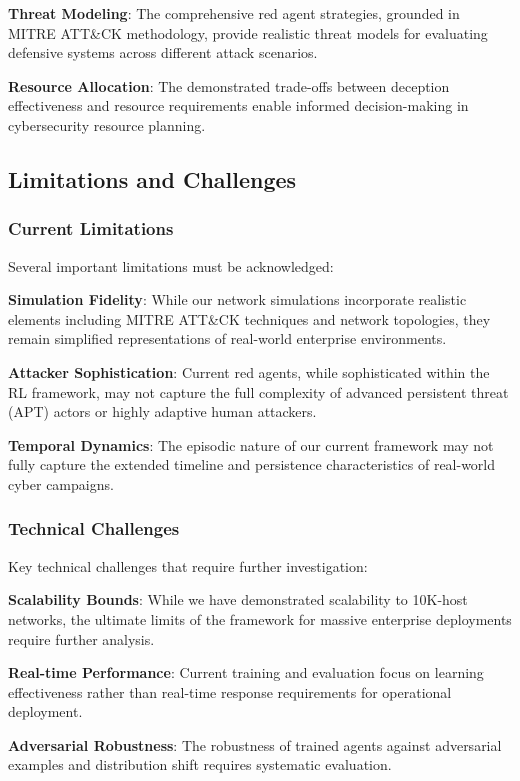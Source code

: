 \documentclass[11pt]{article}
\theoremstyle{definition}
\theoremstyle{plain}
\begin{document}
\textbf{Threat Modeling}: The comprehensive red agent strategies, grounded in MITRE ATT\&CK methodology, provide realistic threat models for evaluating defensive systems across different attack scenarios.

\textbf{Resource Allocation}: The demonstrated trade-offs between deception effectiveness and resource requirements enable informed decision-making in cybersecurity resource planning.

\subsection{Limitations and Challenges}

\subsubsection{Current Limitations}
Several important limitations must be acknowledged:

\textbf{Simulation Fidelity}: While our network simulations incorporate realistic elements including MITRE ATT\&CK techniques and network topologies, they remain simplified representations of real-world enterprise environments.

\textbf{Attacker Sophistication}: Current red agents, while sophisticated within the RL framework, may not capture the full complexity of advanced persistent threat (APT) actors or highly adaptive human attackers.

\textbf{Temporal Dynamics}: The episodic nature of our current framework may not fully capture the extended timeline and persistence characteristics of real-world cyber campaigns.

\subsubsection{Technical Challenges}
Key technical challenges that require further investigation:

\textbf{Scalability Bounds}: While we have demonstrated scalability to 10K-host networks, the ultimate limits of the framework for massive enterprise deployments require further analysis.

\textbf{Real-time Performance}: Current training and evaluation focus on learning effectiveness rather than real-time response requirements for operational deployment.

\textbf{Adversarial Robustness}: The robustness of trained agents against adversarial examples and distribution shift requires systematic evaluation.
\end{document}
